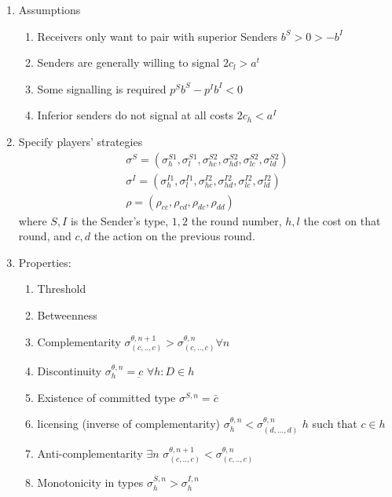 \documentclass[11pt]{article}
\theoremstyle{plainCl1}
\begin{document}
\begin{enumerate}[label={(\alph*)}]
\begin{enumerate}[label={(\arabic*)}]
\begin{itemize}
			\end{itemize}
	\end{enumerate}
\item Assumptions
	\begin{enumerate}[label={(\arabic*)}]
	\item Receivers only want to pair with superior Senders \quad $b^S > 0 > -b^I$
	\item Senders are generally willing to signal \quad $2c_l > a^t$
	\item Some signalling is required \quad $p^S b^S - p^I b^I <0$
	\item Inferior senders do not signal at all costs \quad $2c_h < a^I$
	\end{enumerate}
	
\item Specify players' strategies
	\begin{equation}\label{strategies2}
	\begin{array}{l}	
	\sigma^S = (\sigma^{S1}_h, \sigma^{S1}_l, \sigma^{S2}_{hc}, \sigma^{S2}_{hd}, \sigma^{S2}_{lc}, \sigma^{S2}_{ld})\\
	\sigma^I = (\sigma^{I1}_h, \sigma^{I1}_l, \sigma^{I2}_{hc}, \sigma^{I2}_{hd}, \sigma^{I2}_{lc}, \sigma^{I2}_{ld})\\
	\rho = (\rho_{cc}, \rho_{cd}, \rho_{dc}, \rho_{dd})
	\end{array}
	\end{equation}
	where $S,I$ is the Sender's type, $1,2$ the round number, $h,l$ the cost on that round, and $c,d$ the action on the previous round.
\item Properties:
	\begin{enumerate}[label={(\arabic*)}]
	    \item Threshold \quad 
	    \item Betweenness \quad
	    \item Complementarity \quad $\sigma^{\theta,n+1}_{(c,..,c)} > \sigma^{\theta,n}_{(c,..,c)} \forall n$
	    \item Discontinuity \quad $\sigma^{\theta,n}_{h} = \underbar{c}$ \quad $\forall h: D \in h$
	    \item Existence of committed type \quad $\sigma^{S,n} = \bar{c}$
	    \item licensing (inverse of complementarity) \quad $\sigma^{\theta,n}_{h} < \sigma^{\theta,n}_{(d,...,d)}$ \quad $h$ such that $c \in h$
	    \item Anti-complementarity \quad $\exists n$ \quad $\sigma^{\theta,n+1}_{(c,..,c)} < \sigma^{\theta,n}_{(c,..,c)}$
	    \item Monotonicity in types \quad $\sigma^{S,n}_{h} > \sigma^{I,n}_{h}$
	\end{enumerate}
\end{enumerate}
\end{document}
